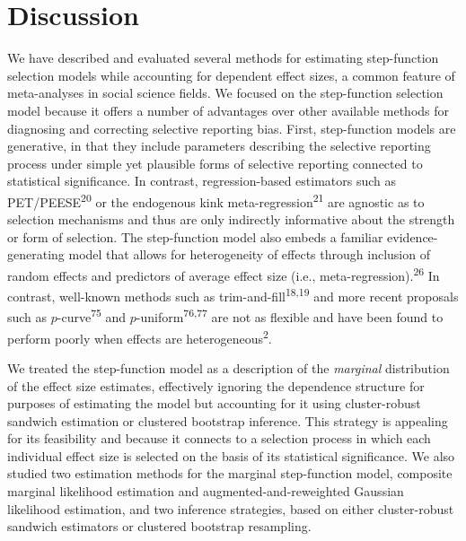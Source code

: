 \documentclass[
  american,
  man, donotrepeattitle,floatsintext]{apa7}
\begin{document}
\section{Discussion}\label{discussion}

We have described and evaluated several methods for estimating step-function selection models while accounting for dependent effect sizes, a common feature of meta-analyses in social science fields.
We focused on the step-function selection model because it offers a number of advantages over other available methods for diagnosing and correcting selective reporting bias.
First, step-function models are generative, in that they include parameters describing the selective reporting process under simple yet plausible forms of selective reporting connected to statistical significance.
In contrast, regression-based estimators such as PET/PEESE\textsuperscript{20} or the endogenous kink meta-regression\textsuperscript{21} are agnostic as to selection mechanisms and thus are only indirectly informative about the strength or form of selection.
The step-function model also embeds a familiar evidence-generating model that allows for heterogeneity of effects through inclusion of random effects and predictors of average effect size (i.e., meta-regression).\textsuperscript{26}
In contrast, well-known methods such as trim-and-fill\textsuperscript{18,19} and more recent proposals such as \(p\)-curve\textsuperscript{75} and \(p\)-uniform\textsuperscript{76,77} are not as flexible and have been found to perform poorly when effects are heterogeneous\textsuperscript{2}.

We treated the step-function model as a description of the \emph{marginal} distribution of the effect size estimates, effectively ignoring the dependence structure for purposes of estimating the model but accounting for it using cluster-robust sandwich estimation or clustered bootstrap inference.
This strategy is appealing for its feasibility and because it connects to a selection process in which each individual effect size is selected on the basis of its statistical significance.
We also studied two estimation methods for the marginal step-function model, composite marginal likelihood estimation and augmented-and-reweighted Gaussian likelihood estimation, and two inference strategies, based on either cluster-robust sandwich estimators or clustered bootstrap resampling.
\end{document}
